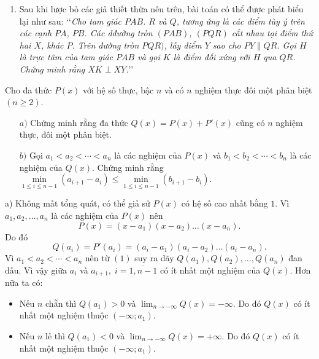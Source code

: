 \begin{bt}
{\begin{nx}
\begin{enumerate}
				\item Sau khi lược bỏ các giả thiết thừa nêu trên, bài toán có thể được phát biểu lại như sau: \lq\lq \textit{Cho tam giác $PAB$. $R$ và $Q$, tương ứng là các điểm tùy ý trên các cạnh $PA$, $PB$. Các dđường tròn $(PAB)$, $(PQR)$ cắt nhau tại điểm thứ hai $X$, khác $P$. Trên đường tròn $PQR)$, lấy điểm $Y$ sao cho $PY\parallel QR$. Gọi $H$ là trực tâm của tam giác $PAB$ và gọi $K$ là điểm đối xứng với $H$ qua $QR$. Chứng minh rằng $XK\perp XY$.}\rq\rq
			\end{enumerate}
		\end{nx}
	}
\end{bt}

\begin{bt}%
	Cho đa thức $P(x)$  với hệ số thực, bậc $n$ và có $n$ nghiệm thực đôi một phân biệt $ \left ( n\geq 2 \right )$.
	\begin{itemize}
		\item [$a)$]  Chứng minh rằng đa thức $Q\left ( x \right )=P\left ( x \right )+P'\left ( x \right ) $ cũng có $n$ nghiệm thực, đôi một phân biệt.
\item [$b)$]  Gọi $a_{1}<a_{2}<\cdots<a_{n} $ là các nghiệm của $P(x) $ và $ b_{1}<b_{2}<\cdots< b_{n}$ là các nghiệm của $Q(x).$ Chứng minh rằng $ \underset{1\leq i\leq n-1}{\min}\left ( a_{i+1} -a_{i}\right )\leq \underset{1\leq i\leq n-1}{\min}\left ( b_{i+1} -b_{i}\right ).$
\end{itemize}	
	\loigiai
	{a) Không mất tổng quát, có thể giả sử  $P(x)$ có hệ số cao nhất bằng $1.$ Vì $ a_1,a_2,\dots,a_n$ là các nghiệm của $P(x)$ nên
		$$P\left ( x \right )=\left ( x-a_1 \right )\left ( x-a_2 \right )\dots\left ( x-a_n \right ). $$
		Do đó 
		\[Q\left ( a_{i} \right )=P'\left ( a_{i} \right )=\left ( a_{i}-a_{1} \right )\left ( a_{i}-a_{2} \right )\dots\left ( a_{i}-a_{n} \right ).\tag{1}\]
		Vì $a_{1}<a_{2}<\cdots<a_{n} $ nên từ $(1)$ suy ra dãy $Q\left ( a_{1} \right ),Q\left ( a_{2} \right ),\dots,Q\left ( a_{n} \right ) $ đan dấu.
		Vì vậy giữa $a_{i} $ và $ a_{i+1},\; i=\overline{1,n-1}$ có ít nhất một nghiệm của $Q(x).$
		Hơn nữa ta có:
		\begin{itemize}
			\item Nếu $n$ chẵn thì $Q\left ( a_{1} \right )>0 $ và $\lim_{n\to -\infty}Q\left ( x \right )=-\infty.$ Do đó $Q(x)$ có ít nhất một nghiệm thuộc $\left (-\infty;a_{1}  \right ). $
			\item Nếu $n$ lẻ thì $Q\left ( a_{1} \right )<0 $ và $\lim_{n\to -\infty}Q\left ( x \right )=+\infty.$ Do đó $Q(x)$ có ít nhất một nghiệm thuộc $\left (-\infty;a_{1}  \right ). $

\end{itemize}}
\end{bt}
